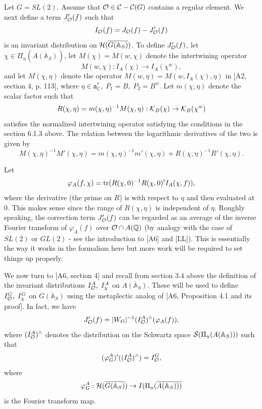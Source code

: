Let $G=SL(2)$. Assume that
${\cal{O}}\in {\cal{C}}-{\cal{C}}(G)$
contains a regular element.
We next define a term $J_{{\cal{O}}}^{\prime }(f)$
such that 
\begin{equation}
I_{{\cal{O}}}(f)=J_{{\cal{O}}}(f)-J_{{\cal{O}}}^{\prime }(f)
\end{equation}
is an invariant distribution on ${\cal{H}}(\overline{G({\mathbb{A}}_S)})$.
To define $J_{\cal{O}}^{\prime }(f)$, let
$\chi \in \Pi _u(\overline{A({\mathbb{A}}_S)})$, let
$M(\chi )=M(w,\chi)$ denote the intertwining operator
\[
M(w,\chi):I_A(\chi )\rightarrow I_A(\chi ^w),
\]
and let $M(\chi ,\eta )$ denote the operator
$M(w,\eta )=M(w,I_A(\chi ),\eta)$ in [A2, section 4, p. 113],
where $\eta \in {\mathfrak {a}}_{{\mathbb {C}}}^{*},\;P_1=B,\;P_2=B^w$.
Let $m(\chi ,\eta )$ denote the scalar factor such that 
\begin{equation}
R(\chi ,\eta )=m(\chi ,\eta )^{-1}M(\chi ,\eta ):
{\cal K}_B(\chi )\rightarrow {\cal K}_B(\chi ^w)
\end{equation}
satisfies the normalized intertwining operator satisfying the conditions in
the section 6.1.3 above. The relation between the logarithmic
derivatives of the two is given by
\begin{equation}
M(\chi ,\eta )^{-1}M'(\chi ,\eta )=
m(\chi ,\eta )^{-1}m'(\chi ,\eta )+
R(\chi ,\eta )^{-1}R'(\chi ,\eta ).
\end{equation}

Let 
\begin{equation}
\varphi _A(f,\chi )
={\rm tr}(R(\chi ,0)^{-1}R(\chi ,0)^{\prime }I_A(\chi ,f)),
\end{equation}
where the derivative (the prime on $R$) is with respect to $\eta $ and then
evaluated at $0$. This makes sense since the range of $R(\chi ,\eta )$ is
independent of $\eta $.
Roughly speaking, the correction term $J_{\cal{O}}^{\prime }(f)$ can be
regarded as an average of the inverse Fourier transform of $\varphi _A(f)$
over ${\cal{O}}\cap A({\mathbb{Q}})$
(by analogy with the case of $SL(2)$ or $GL(2)$
- see the introduction to [A6] and [LL]). This is
essentially the way
it works in the formalism here but more work will be required to set things
up properly.

We now turn to [A6, section 4] and recall from section 3.4 above  the
definition of the invariant distributions
$I_{{\cal{O}}}^A,\;I_\chi ^A$ on $\overline{A({\mathbb{A}}_S)}$.
These will be used to define $I_{{\cal{O}}}^G,\;I_\chi ^G$ on 
$\overline{G({\mathbb{A}}_S)}$ using the metaplectic analog of
[A6, Proposition 4.1 and its proof]. In fact, we
have 
\begin{equation}
J_{{\cal{O}}}^{\prime }(f)
=|W_G|^{-1}(I_{{\cal{O}}}^A)^{\wedge }(\varphi_A(f)),
\end{equation}
where $(I_{{\cal{O}}}^A)^{\wedge }$ denotes the distribution on the
Schwartz space ${\cal{S}}(\Pi _u(A({\mathbb {A}}_S)))$ such that 
\[
(\varphi _G^A)^{\prime }((I_{\cal{O}}^A)^{\wedge })=I_{\cal{O}}^G, 
\]
where 
\[
\varphi_G^A:{\cal{H}}(\overline{G({\mathbb {A}}_S)})\rightarrow
I(\Pi _u(\overline{A({\mathbb {A}_S)})) }
\]
is the Fourier transform map.


